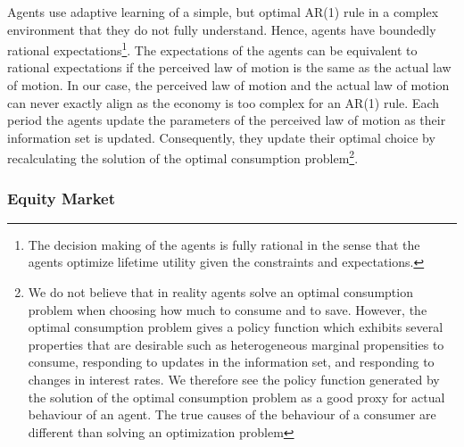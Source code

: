 \noindent Agents use adaptive learning of a simple, but optimal AR(1) rule in a complex environment that they do not fully understand. Hence, agents have boundedly rational expectations\footnote{The decision making of the agents is fully rational in the sense that the agents optimize lifetime utility given the constraints and expectations.}. The expectations of the agents can be equivalent to rational expectations if the perceived law of motion is the same as the actual law of motion. In our case, the perceived law of motion and the actual law of motion can never exactly align as the economy is too complex for an AR(1) rule. Each period the agents update the parameters of the perceived law of motion as their information set is updated. Consequently, they update their optimal choice by recalculating the solution of the optimal consumption problem\footnote{We do not believe that in reality agents solve an optimal consumption problem when choosing how much to consume and to save. However, the optimal consumption problem gives a policy function which exhibits several properties that are desirable such as heterogeneous marginal propensities to consume, responding to updates in the information set, and responding to changes in interest rates. We therefore see the policy function generated by the solution of the optimal consumption problem as a good proxy for actual behaviour of an agent. The true causes of the behaviour of a consumer are different than solving an optimization problem}.

\subsubsection{Equity Market}

